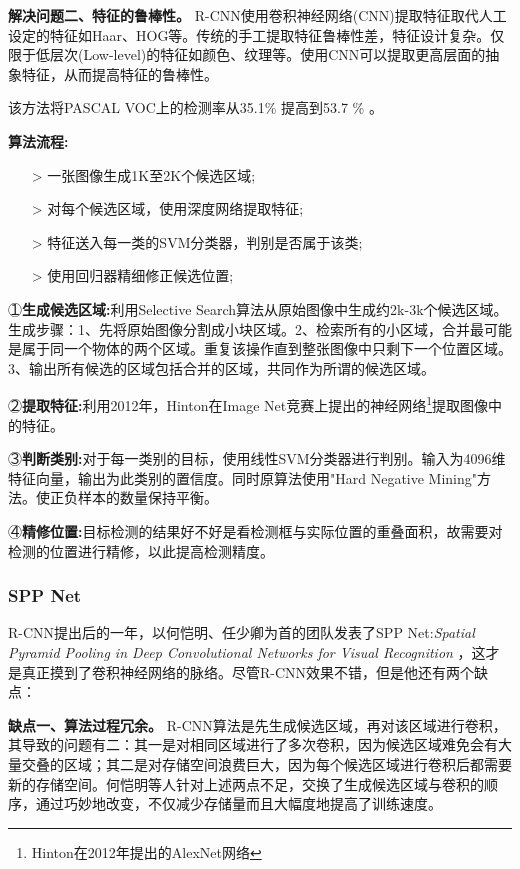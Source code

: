 \textbf{解决问题二、特征的鲁棒性。}
R-CNN使用卷积神经网络(CNN)提取特征取代人工设定的特征如Haar、HOG等。传统的手工提取特征鲁棒性差，特征设计复杂。仅限于低层次(Low-level)的特征如颜色、纹理等。使用CNN可以提取更高层面的抽象特征，从而提高特征的鲁棒性。

该方法将PASCAL VOC上的检测率从35.1\% 提高到53.7 \% 。

\textbf{算法流程:}

\line
\begin{itemize}
	\setlength{\itemsep}{0pt}
	\setlength{\parsep}{0pt}
	\setlength{\parskip}{0pt}
	\item[>] 一张图像生成1K至2K个候选区域;
	\item[>] 对每个候选区域，使用深度网络提取特征;
	\item[>] 特征送入每一类的SVM分类器，判别是否属于该类;
	\item[>] 使用回归器精细修正候选位置;
\end{itemize}
\line

\textcircled{１}\textbf{生成候选区域:}利用Selective Search\cite{ss}算法从原始图像中生成约2k-3k个候选区域。生成步骤：1、先将原始图像分割成小块区域。2、检索所有的小区域，合并最可能是属于同一个物体的两个区域。重复该操作直到整张图像中只剩下一个位置区域。3、输出所有候选的区域包括合并的区域，共同作为所谓的候选区域。

\textcircled{２}\textbf{提取特征:}利用2012年，Hinton在Image Net竞赛上提出的神经网络\footnote{Hinton在2012年提出的AlexNet网络}提取图像中的特征。

\textcircled{３}\textbf{判断类别:}对于每一类别的目标，使用线性SVM\cite{svm}分类器进行判别。输入为4096维特征向量，输出为此类别的置信度。同时原算法使用"Hard Negative Mining"\cite{hnm}方法。使正负样本的数量保持平衡。

\textcircled{４}\textbf{精修位置:}目标检测的结果好不好是看检测框与实际位置的重叠面积，故需要对检测的位置进行精修，以此提高检测精度。 

\subsubsection{SPP Net}
R-CNN提出后的一年，以何恺明、任少卿为首的团队发表了SPP Net:\textit{Spatial Pyramid Pooling in Deep Convolutional Networks for Visual Recognition}\cite{sppnet} ，这才是真正摸到了卷积神经网络的脉络。尽管R-CNN效果不错，但是他还有两个缺点：

\textbf{缺点一、算法过程冗余。}
R-CNN算法是先生成候选区域，再对该区域进行卷积，其导致的问题有二：其一是对相同区域进行了多次卷积，因为候选区域难免会有大量交叠的区域；其二是对存储空间浪费巨大，因为每个候选区域进行卷积后都需要新的存储空间。何恺明等人针对上述两点不足，交换了生成候选区域与卷积的顺序，通过巧妙地改变，不仅减少存储量而且大幅度地提高了训练速度。

